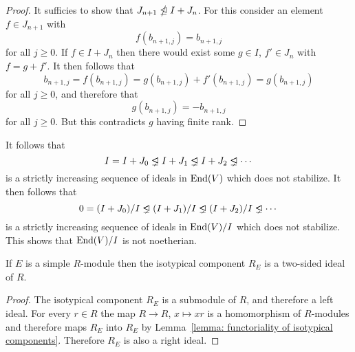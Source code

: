 \begin{example}
  \begin{proof}
    It sufficies to show that $J_{n+1} \ntrianglelefteq I + J_n$.
    For this consider an element $f \in J_{n+1}$ with
    \[
      f(b_{n+1, j}) = b_{n+1,j}
    \]
    for all $j \geq 0$.
    If $f \in I + J_n$ then there would exist some $g \in I$, $f' \in J_n$ with $f = g + f'$.
    It then follows that
    \[
        b_{n+1,j}
      = f(b_{n+1,j})
      = g(b_{n+1,j}) + f'(b_{n+1,j})
      = g(b_{n+1,j})
    \]
    for all $j \geq 0$, and therefore that
    \[
        g(b_{n+1,j})
      = -b_{n+1,j}
    \]
    for all $j \geq 0$.
    But this contradicts $g$ having finite rank.
  \end{proof}

  It follows that
  \[
                I
    =           I + J_0
    \ideallneq  I + J_1
    \ideallneq  I + J_2
    \ideallneq  \dotsb
  \]
  is a strictly increasing sequence of ideals in $\operatorname{End}(V)$ which does not stabilize.
  It then follows that
  \[
                0
    =           (I + J_0)/I
    \ideallneq  (I + J_1)/I
    \ideallneq  (I + J_2)/I
    \ideallneq  \dotsb
  \]
  is a strictly increasing sequence of ideals in $\operatorname{End}(V)/I$ which does not stabilize.
  This shows that $\operatorname{End}(V)/I$ is not noetherian.
\end{example}


\begin{lemma}
  \label{lemma: isotypical components are two sided ideals}
  If $E$ is a simple $R$-module then the isotypical component $R_E$ is a two-sided ideal of $R$.
\end{lemma}


\begin{proof}
  The isotypical component $R_E$ is a submodule of $R$, and therefore a left ideal.
  For every $r \in R$ the map $R \to R$, $x \mapsto xr$ is a homomorphism of $R$-modules and therefore maps $R_E$ into $R_E$ by Lemma~\ref{lemma: functoriality of isotypical components}.
  Therefore $R_E$ is also a right ideal.
\end{proof}


